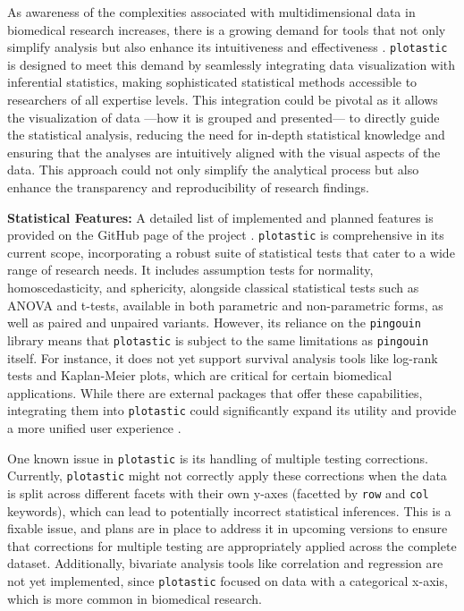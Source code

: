 %
\label{sec:C2_discussion}%
As awareness of the complexities associated with multidimensional data in
biomedical research increases, there is a growing demand for tools that not only
simplify analysis but also enhance its intuitiveness and effectiveness
\cite{dunnExploringVisualizingMultidimensional2017}. \texttt{plotastic} is
designed to meet this demand by seamlessly integrating data visualization with
inferential statistics, making sophisticated statistical methods accessible to
researchers of all expertise levels. This integration could be pivotal as it
allows the visualization of data —how it is grouped and presented— to directly
guide the statistical analysis, reducing the need for in-depth statistical
knowledge and ensuring that the analyses are intuitively aligned with the visual
aspects of the data. This approach could not only simplify the analytical process
but also enhance the transparency and reproducibility of research findings.



\textbf{Statistical Features:}
A detailed list of implemented and planned features is provided on the GitHub
page of the project \cite{kuricMarkur4Plotastic2024}. \texttt{plotastic} is
comprehensive in its current scope, incorporating a robust suite of statistical
tests that cater to a wide range of research needs. It includes assumption tests
for normality, homoscedasticity, and sphericity, alongside classical statistical
tests such as ANOVA and t-tests, available in both parametric and non-parametric
forms, as well as paired and unpaired variants. However, its reliance on the
\texttt{pingouin} library means that \texttt{plotastic} is subject to the same
limitations as \texttt{pingouin} itself. For instance, it does not yet support
survival analysis tools like log-rank tests and Kaplan-Meier plots, which are
critical for certain biomedical applications. While there are external packages
that offer these capabilities, integrating them into \texttt{plotastic} could
significantly expand its utility and provide a more unified user experience
\cite{davidson-pilonLifelinesSurvivalAnalysis2019}.

One known issue in \texttt{plotastic} is its handling of multiple testing
corrections. Currently, \texttt{plotastic} might not correctly apply these
corrections when the data is split across different facets with their own y-axes
(facetted by \texttt{row} and \texttt{col} keywords), which can lead to
potentially incorrect statistical inferences. This is a fixable issue, and plans
are in place to address it in upcoming versions to ensure that corrections for
multiple testing are appropriately applied across the complete dataset.
Additionally, bivariate analysis tools like correlation and regression are not
yet implemented, since \texttt{plotastic} focused on data with a categorical
x-axis, which is more common in biomedical research.


